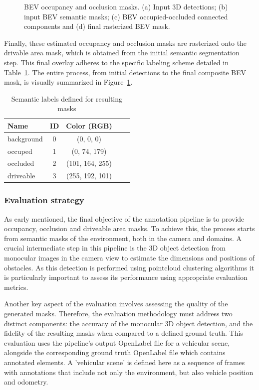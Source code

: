 \begin{figure}[h!]
    \caption{BEV occupancy and occlusion masks. (a) Input 3D detections; (b) input BEV semantic masks; (c) BEV occupied-occluded connected components and (d) final rasterized BEV mask.}
    \label{fig:bev_occupancy_occlusion}
\end{figure}


Finally, these estimated occupancy and occlusion masks are rasterized onto the  drivable area mask, which is obtained from the initial semantic segmentation step. This final overlay adheres to the specific labeling scheme detailed in Table~\ref{tab:occ2_labels}. The entire process, from initial detections to the final composite BEV mask, is visually summarized in Figure~\ref{fig:bev_occupancy_occlusion}.

\begin{table}[h]
    \centering
    \begin{tabular}{l c c c c}
        \toprule
        \textbf{Name} & \textbf{ID} & \textbf{Color (RGB)} \\
        \midrule
        background  & 0 & (0, 0, 0)         \\
        occuped     & 1 & (0, 74, 179)      \\
        occluded    & 2 & (101, 164, 255)   \\
        driveable   & 3 & (255, 192, 101)   \\

        \bottomrule
    \end{tabular}
    \caption{Semantic labels defined for resulting masks}
    \label{tab:occ2_labels}
\end{table}

\subsubsection{Evaluation strategy}
As early mentioned, the final objective of the annotation pipeline is to provide occupancy, occlusion and driveable area masks. To achieve this, the process starts from semantic masks of the environment, both in the camera and  domains. A crucial intermediate step in this pipeline is the 3D object detection from monocular images in the camera view to estimate the dimensions and positions of obstacles. As this detection is performed using pointcloud clustering algorithms it is particularly important to assess its performance using appropriate evaluation metrics.

Another key aspect of the evaluation involves assessing the quality of the generated  masks. Therefore, the evaluation methodology must address two distinct components: the accuracy of the monocular 3D object detection, and the fidelity of the resulting  masks when compared to a defined ground truth. This evaluation uses the pipeline's output OpenLabel file for a vehicular scene, alongside the corresponding ground truth OpenLabel file which contains annotated elements. A 'vehicular scene' is defined here as a sequence of frames with annotations that include not only the environment, but also vehicle position and odometry.

